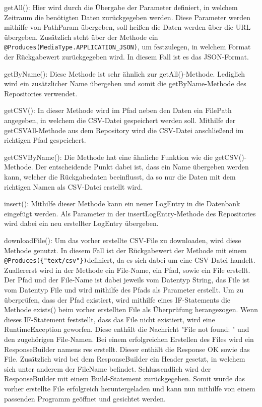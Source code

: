 \begin{compactitem}
    \item getAll(): Hier wird durch die Übergabe der Parameter definiert, in welchem Zeitraum die benötigten Daten zurückgegeben werden. Diese Parameter werden mithilfe von PathParam übergeben, soll heißen die Daten werden über die URL übergeben. Zusätzlich steht über der Methode ein \texttt{@Produces(MediaType.APPLICATION\_JSON)}, um festzulegen, in welchem Format der Rückgabewert zurückgegeben wird. In diesem Fall ist es das JSON-Format.
    \item getByName(): Diese Methode ist sehr ähnlich zur getAll()-Methode. Lediglich wird ein zusätzlicher Name übergeben und somit die getByName-Methode des Repositories verwendet.
    \item getCSV(): In dieser Methode wird im Pfad neben den Daten ein FilePath angegeben, in welchem die CSV-Datei gespeichert werden soll. Mithilfe der getCSVAll-Methode aus dem Repository wird die CSV-Datei anschließend im richtigen Pfad gespeichert.
    \item getCSVByName(): Die Methode hat eine ähnliche Funktion wie die getCSV()-Methode. Der entscheidende Punkt dabei ist, dass ein Name übergeben werden kann, welcher die Rückgabedaten beeinflusst, da so nur die Daten mit dem richtigen Namen als CSV-Datei erstellt wird. 
    \item insert(): Mithilfe dieser Methode kann ein neuer LogEntry in die Datenbank eingefügt werden. Als Parameter in der insertLogEntry-Methode des Repositories wird dabei ein neu erstellter LogEntry übergeben.
    \item downloadFile(): Um das vorher erstellte CSV-File zu downloaden, wird diese Methode genutzt. In diesem Fall ist der Rückgabewert der Methode mit einem \texttt{@Produces(\{"text/csv"\})}definiert, da es sich dabei um eine CSV-Datei handelt. Zuallererst wird in der Methode ein File-Name, ein Pfad, sowie ein File erstellt. Der Pfad und der File-Name ist dabei jeweils vom Datentyp String, das File ist vom Datentyp File und wird mithilfe des Pfads als Parameter erstellt. Um zu überprüfen, dass der Pfad existiert, wird mithilfe eines IF-Statements die Methode exists() beim vorher erstellten File als Überprüfung herangezogen. Wenn dieses IF-Statement feststellt, dass das File nicht existiert, wird eine RuntimeException geworfen. Diese enthält die Nachricht "File not found: " und den zugehörigen File-Namen. Bei einem erfolgreichen Erstellen des Files wird ein ResponseBuilder namens res erstellt. Dieser enthält die Response OK sowie das File. Zusätzlich wird bei dem ResponseBuilder ein Header gesetzt, in welchem sich unter anderem der FileName befindet. Schlussendlich wird der ResponseBuilder mit einem Build-Statement zurückgegeben. Somit wurde das vorher erstellte File erfolgreich heruntergeladen und kann nun mithilfe von einem passenden Programm geöffnet und gesichtet werden.
\end{compactitem}
 
